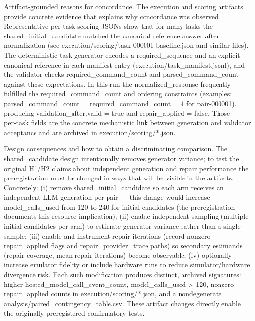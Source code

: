 \documentclass[conference]{IEEEtran}
\begin{document}
Artifact‑grounded reasons for concordance. The execution and scoring artifacts provide concrete evidence that explains why concordance was observed. Representative per‑task scoring JSONs show that for many tasks the shared\_initial\_candidate matched the canonical reference answer after normalization (see execution/scoring/task‑000001‑baseline.json and similar files). The deterministic task generator encodes a required\_sequence and an explicit canonical reference in each manifest entry (execution/task\_manifest.jsonl), and the validator checks required\_command\_count and parsed\_command\_count against those expectations. In this run the normalized\_response frequently fulfilled the required\_command\_count and ordering constraints (examples: parsed\_command\_count = required\_command\_count = 4 for pair‑000001), producing validation\_after.valid = true and repair\_applied = false. Those per‑task fields are the concrete mechanistic link between generation and validator acceptance and are archived in execution/scoring/*.json.

Design consequences and how to obtain a discriminating comparison. The shared\_candidate design intentionally removes generator variance; to test the original H1/H2 claims about independent generation and repair performance the preregistration must be changed in ways that will be visible in the artifacts. Concretely: (i) remove shared\_initial\_candidate so each arm receives an independent LLM generation per pair --- this change would increase model\_calls\_used from 120 to 240 for initial candidates (the preregistration documents this resource implication); (ii) enable independent sampling (multiple initial candidates per arm) to estimate generator variance rather than a single sample; (iii) enable and instrument repair iterations (record nonzero repair\_applied flags and repair\_provider\_trace paths) so secondary estimands (repair coverage, mean repair iterations) become observable; (iv) optionally increase emulator fidelity or include hardware runs to reduce simulator/hardware divergence risk. Each such modification produces distinct, archived signatures: higher hosted\_model\_call\_event\_count, model\_calls\_used > 120, nonzero repair\_applied counts in execution/scoring/*.json, and a nondegenerate analysis/paired\_contingency\_table.csv. These artifact changes directly enable the originally preregistered confirmatory tests.
\end{document}
